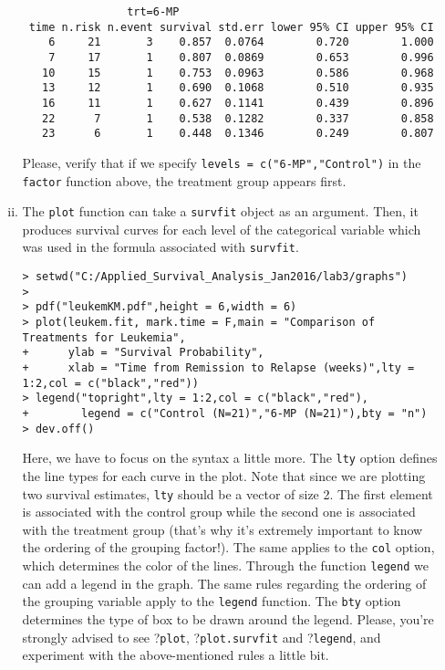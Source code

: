 \begin{enumerate}[(a)]
\begin{enumerate}[(i)]
\begin{footnotesize}
\begin{verbatim}
                trt=6-MP 
 time n.risk n.event survival std.err lower 95% CI upper 95% CI
    6     21       3    0.857  0.0764        0.720        1.000
    7     17       1    0.807  0.0869        0.653        0.996
   10     15       1    0.753  0.0963        0.586        0.968
   13     12       1    0.690  0.1068        0.510        0.935
   16     11       1    0.627  0.1141        0.439        0.896
   22      7       1    0.538  0.1282        0.337        0.858
   23      6       1    0.448  0.1346        0.249        0.807
\end{verbatim}
\end{footnotesize}
Please, verify that if we specify \verb|levels = c("6-MP","Control")| in the \verb|factor| function above, the treatment group appears first.
\item The \verb|plot| function can take a \verb|survfit| object as an argument. Then, it produces survival curves for each level of the categorical variable which was used in the formula associated with \verb|survfit|. 
\begin{footnotesize}
\begin{verbatim}
> setwd("C:/Applied_Survival_Analysis_Jan2016/lab3/graphs")
> 
> pdf("leukemKM.pdf",height = 6,width = 6)
> plot(leukem.fit, mark.time = F,main = "Comparison of Treatments for Leukemia",
+      ylab = "Survival Probability",
+      xlab = "Time from Remission to Relapse (weeks)",lty = 1:2,col = c("black","red"))
> legend("topright",lty = 1:2,col = c("black","red"),
+        legend = c("Control (N=21)","6-MP (N=21)"),bty = "n")
> dev.off()
\end{verbatim}
\end{footnotesize}
Here, we have to focus on the syntax a little more. The \verb|lty| option defines the line types for each curve in the plot. Note that since we are plotting two survival estimates, \verb|lty| should be a vector of size 2. The first element is associated with the control group while the second one is associated with the treatment group (that's why it's extremely important to know the ordering of the grouping factor!). The same applies to the \verb|col| option, which determines the color of the lines. Through the function \verb|legend| we can add a legend in the graph. The same rules regarding the ordering of the grouping variable apply to the \verb|legend| function. The \verb|bty| option determines the type of box to be drawn around the legend. Please, you're strongly advised to see ?\verb|plot|, ?\verb|plot.survfit| and ?\verb|legend|, and experiment with the above-mentioned rules a little bit.


\end{enumerate}
\end{enumerate}
